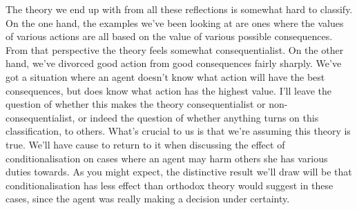 The theory we end up with from all these reflections is somewhat hard to classify. On the one hand, the examples we've been looking at are ones where the values of various actions are all based on the value of various possible consequences. From that perspective the theory feels somewhat consequentialist. On the other hand, we've divorced good action from good consequences fairly sharply. We've got a situation where an agent doesn't know what action will have the best consequences, but does know what action has the highest value. I'll leave the question of whether this makes the theory consequentialist or non-consequentialist, or indeed the question of whether anything turns on this classification, to others. What's crucial to us is that we're assuming this theory is true. We'll have cause to return to it when discussing the effect of conditionalisation on cases where an agent may harm others she has various duties towards. As you might expect, the distinctive result we'll draw will be that conditionalisation has less effect than orthodox theory would suggest in these cases, since the agent was really making a decision under certainty.
